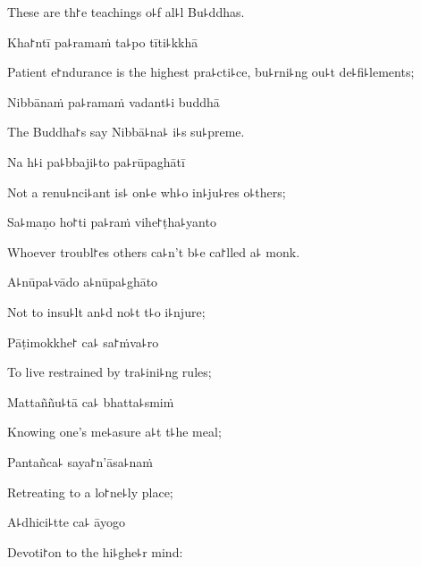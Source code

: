\begin{english}
  These are th꜓e teachings o꜕f al꜕l Bu꜕ddhas.
\end{english}

Kha꜓ntī pa꜕ramaṁ ta꜕po tīti꜕kkhā

\begin{english}
  Patient e꜓ndurance is the highest pra꜕cti꜕ce, bu꜕rni꜕ng ou꜕t de꜕fi꜕lements;
\end{english}

Nibbānaṁ pa꜕ramaṁ vadant꜕i buddhā

\begin{english}
  The Buddha꜓s say Nibbā꜕na꜕ i꜕s su꜕preme.
\end{english}

Na h꜕i pa꜕bbaji꜕to pa꜕rūpaghātī

\begin{english}
  Not a renu꜕nci꜕ant is꜕ on꜕e wh꜕o in꜕ju꜕res o꜕thers;
\end{english}

Sa꜕maṇo ho꜓ti pa꜕raṁ vihe꜓ṭha꜕yanto

\begin{english}
  Whoever troubl꜓es others ca꜕n't b꜕e ca꜓lled a꜕ monk.
\end{english}

\clearpage

A꜕nūpa꜕vādo a꜕nūpa꜕ghāto

\begin{english}
  Not to insu꜕lt an꜕d no꜕t t꜕o i꜕njure;
\end{english}

Pāṭimokkhe꜓ ca꜕ sa꜓ṁva꜕ro

\begin{english}
  To live restrained by tra꜕ini꜕ng rules;
\end{english}

Mattaññu꜕tā ca꜕ bhatta꜕smiṁ

\begin{english}
  Knowing one's me꜕asure a꜕t t꜕he meal;
\end{english}

Pantañca꜕ saya꜓n'āsa꜕naṁ

\begin{english}
  Retreating to a lo꜓ne꜕ly place;
\end{english}

A꜕dhici꜕tte ca꜕ āyogo

\begin{english}
  Devoti꜓on to the hi꜕ghe꜕r mind:
\end{english}

